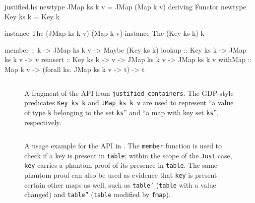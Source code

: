 \documentclass[format=sigplan, review=false, screen=true, 10pt]{acmart}
\begin{document}
\begin{filecontents*}{justified.hs}
newtype JMap ks k v = JMap (Map k v) deriving Functor
newtype Key  ks k   = Key k

instance The (JMap ks k v) (Map k v)
instance The (Key ks k) k

member   :: k -> JMap ks k v -> Maybe (Key ks k)
lookup   :: Key ks k -> JMap ks k v -> v
reinsert :: Key ks k -> v -> JMap ks k v -> JMap ks k v
withMap  :: Map k v -> (forall ks. JMap ks k v -> t) -> t
\end{filecontents*}


\begin{figure}
  \inputminted{haskell}{justified.hs}
  \caption{A fragment of the API from \texttt{justified-containers}.
    The GDP-style predicates \texttt{Key ks k} and \texttt{JMap ks k v} are used to represent
    ``a value of type \texttt{k} belonging to the set \texttt{ks}'' and ``a map with key set \texttt{ks}'',
    respectively. \label{justified-api}}
\end{figure}
\begin{figure}
  \inputminted{haskell}{justified-usage.hs}
  \caption{A usage example for the API in . The \texttt{member} function is used
    to check if a key is present in \texttt{table}; within the scope of the \texttt{Just} case, \texttt{key}
    carries a phantom proof of its presence in \texttt{table}. The same phantom proof can also be used as evidence that
    \texttt{key} is present certain other maps as well, such as \texttt{table'} (\texttt{table} with a
    value changed) and \texttt{table''} (\texttt{table} modified by \texttt{fmap}).\label{justified-usage}} 
\end{figure}
\end{document}
